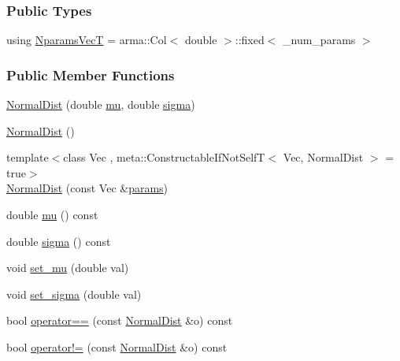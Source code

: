 \subsubsection*{Public Types}
\begin{DoxyCompactItemize}
\item 
using \hyperlink{classprior__hessian_1_1NormalDist_a3a82189e42c48ff21ad49d85c7d9cf5d}{Nparams\+VecT} = arma\+::\+Col$<$ double $>$\+::fixed$<$ \+\_\+num\+\_\+params $>$
\end{DoxyCompactItemize}
\subsubsection*{Public Member Functions}
\begin{DoxyCompactItemize}
\item 
\hyperlink{classprior__hessian_1_1NormalDist_a73a47151970398a524eeaf0983463932}{Normal\+Dist} (double \hyperlink{classprior__hessian_1_1NormalDist_a33b6cc4357406f8d0dd017fc1088e1bc}{mu}, double \hyperlink{classprior__hessian_1_1NormalDist_adfc5ab11dc02672d9ef08eda487f97a7}{sigma})
\item 
\hyperlink{classprior__hessian_1_1NormalDist_ab9cb95afad0a45d4b588c3c8ea847805}{Normal\+Dist} ()
\item 
{\footnotesize template$<$class Vec , meta\+::\+Constructable\+If\+Not\+Self\+T$<$ Vec, Normal\+Dist $>$  = true$>$ }\\\hyperlink{classprior__hessian_1_1NormalDist_a0eb6e0db72b51cb8718d23ad317a7d0e}{Normal\+Dist} (const Vec \&\hyperlink{classprior__hessian_1_1NormalDist_aaea8964b1f62318c047e3c75ac104436}{params})
\item 
double \hyperlink{classprior__hessian_1_1NormalDist_a33b6cc4357406f8d0dd017fc1088e1bc}{mu} () const 
\item 
double \hyperlink{classprior__hessian_1_1NormalDist_adfc5ab11dc02672d9ef08eda487f97a7}{sigma} () const 
\item 
void \hyperlink{classprior__hessian_1_1NormalDist_a078a35e8ded3164ca701e1a1b6918f39}{set\+\_\+mu} (double val)
\item 
void \hyperlink{classprior__hessian_1_1NormalDist_aa72eaaeda9a2fe0475ee78f08359d096}{set\+\_\+sigma} (double val)
\item 
bool \hyperlink{classprior__hessian_1_1NormalDist_aa90f1b24ee10d8692ab29b2ab019d6f7}{operator==} (const \hyperlink{classprior__hessian_1_1NormalDist}{Normal\+Dist} \&o) const 
\item 
bool \hyperlink{classprior__hessian_1_1NormalDist_ade1454cb5b7e913871723f174acd9dcc}{operator!=} (const \hyperlink{classprior__hessian_1_1NormalDist}{Normal\+Dist} \&o) const 

\end{DoxyCompactItemize}
